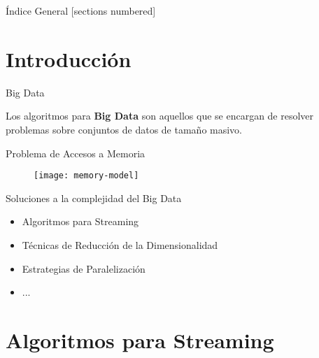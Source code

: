 \documentclass[12pt]{beamer}
\begin{document}
  \maketitle

  \begin{frame}{Índice General}
    [sections numbered]
    \tableofcontents[hideallsubsections]
  \end{frame}

  \section{Introducción}

    \begin{frame}[fragile]{Big Data}

      Los algoritmos para \textbf{Big Data} son aquellos que se encargan de resolver problemas sobre conjuntos de datos de tamaño masivo.

    \end{frame}

    \begin{frame}[fragile]{Problema de Accesos a Memoria}

      \begin{figure}
        \texttt{[image: memory-model]}
        \caption{}
        \label{}
      \end{figure}

    \end{frame}

    \begin{frame}[fragile]{Soluciones a la complejidad del Big Data}

      \begin{itemize}
        \item Algoritmos para Streaming
        \item Técnicas de Reducción de la Dimensionalidad
        \item Estrategias de Paralelización
        \item ...
      \end{itemize}

    \end{frame}

  \section{Algoritmos para Streaming}
\end{document}
